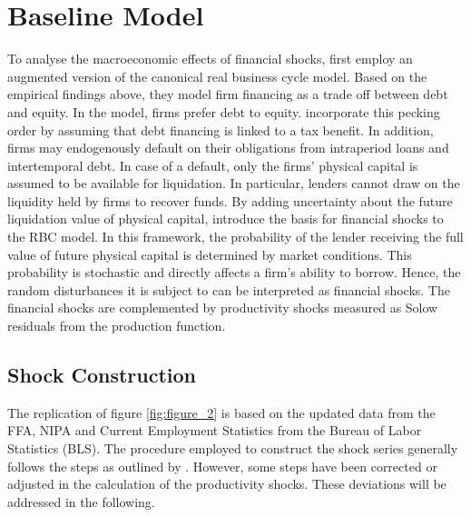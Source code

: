 \section{Baseline Model}
\label{sec:baseline_model}

To analyse the macroeconomic effects of financial shocks, \citeauthor{JERMANNfinancial} first employ an augmented version of the canonical real business cycle model. Based on the empirical findings above, they model firm financing as a trade off between debt and equity. In the model, firms prefer debt to equity. \citeauthor{JERMANNfinancial} incorporate this pecking order by assuming that debt financing is linked to a tax benefit. In addition, firms may endogenously default on their obligations from intraperiod loans and intertemporal debt. In case of a default, only the firms' physical capital is assumed to be available for liquidation. In particular, lenders cannot draw on the liquidity held by firms to recover funds. By adding uncertainty about the future liquidation value of physical capital, \citeauthor{JERMANNfinancial} introduce the basis for financial shocks to the RBC model. In this framework, the probability of the lender receiving the full value of future physical capital is determined by market conditions. This probability is stochastic and directly affects a firm's ability to borrow. Hence, the random disturbances it is subject to can be interpreted as financial shocks. The financial shocks are complemented by productivity shocks measured as Solow residuals from the production function.


\subsection{Shock Construction}
\label{sec:shock_construction}



The replication of figure \ref{fig:figure_2} is based on the updated data from the FFA, NIPA and Current Employment Statistics from the Bureau of Labor Statistics (BLS). The procedure employed to construct the shock series generally follows the steps as outlined by \citeauthor{JERMANNfinancial}. However, some steps have been corrected or adjusted in the calculation of the productivity shocks. These deviations will be addressed in the following. 

